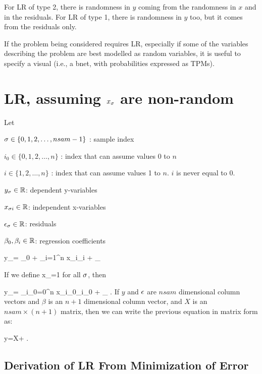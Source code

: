 For LR of type 2,
there is randomness in $y$
coming from the randomness in $x$
and in the residuals.
For LR of type 1,
there  is randomness in $y$
too, but
it comes
from the residuals
only.

If the problem being considered requires LR, especially if some of the variables
describing the problem are best modelled as random variables, it is
useful to specify a visual
 (i.e., a bnet,
with probabilities expressed as TPMs).


\section{LR, assuming
$x_\sigma$ are non-random}

Let

$\sigma\in\{0, 1, 2, \ldots, nsam-1\}$ : sample index

$i_0\in\{0, 1, 2, \ldots, n\}$ :
index that can assume values 0 to $n$

$i\in\{1, 2, \ldots, n\}$ :
index that can assume values 1 to $n$.
$i$ is never equal to 0.


$y_\sigma\in { \mathbb{R}}$: dependent y-variables

$x_{\sigma i}\in { \mathbb{R}}$: independent x-variables

$\epsilon_\sigma\in { \mathbb{R}}$: residuals

$\beta_0, \beta_i\in { \mathbb{R}}$:
regression coefficients


\beq
y_\s= \beta_0 +
\sum_{i=1}^{n} x_{\s i}\beta_{i} + \eps_\s
\label{eq-LR-start}
\eeq

If we define
\beq
x_{}=1
\;
\eeq
for all $\sigma$, then

\beq
y_\s=
\sum_{i_0=0}^{n} x_{\s i_0}\beta_{i_0} + \eps_\s
\;.
\eeq
If $y$ and $\epsilon$ are $nsam$ dimensional
 column vectors and $\beta$
is an $n+1$ dimensional column vector,
and $X$ is an $nsam\times (n+1)$ matrix,
then we can write the previous equation in matrix
form as:


\beq
y=X\beta+\eps
\;.
\eeq

\subsection{Derivation of LR
 From Minimization of Error}

